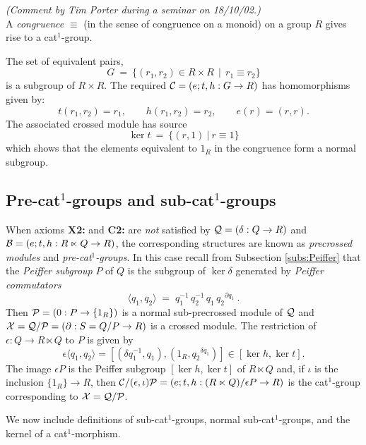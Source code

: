 \begin{prop}
\emph{(Comment by Tim Porter during a seminar on 18/10/02.)\\}
A \emph{congruence}  $\equiv$ 
(in the sense of congruence on a monoid) 
on a group $R$ gives rise to a cat$^1$-group.
\end{prop}
\begin{pf}
The set of equivalent pairs,
$$
G ~=~ \{(r_1,r_2) \in R \times R ~~|~~ r_1 \equiv r_2 \}
$$
is a subgroup of  $R \times R$.
The required  $\mathcal{C} = (e;t,h : G \to R )$  has homomorphisms given by:
$$
t(r_1,r_2) = r_1, \qquad
h(r_1,r_2) = r_2, \qquad
e(r) = (r,r).
$$
The associated crossed module has source
$$
\ker t ~=~ \{(r,1) ~|~ r \equiv 1 \}
$$
which shows that the elements equivalent to $1_R$ in the congruence
form a normal subgroup.
\end{pf}



\subsection{Pre-cat$^1$-groups and sub-cat$^1$-groups} \label{subs:precat1}

When axioms \textbf{X2:} and \textbf{C2:} are \emph{not} satisfied
by  $\mathcal{Q} = (\delta : Q \to R)$  and  
$\mathcal{B} = (e;t,h : R \ltimes Q \to R)$,
the corresponding structures are known as \emph{precrossed modules}
and \emph{pre-cat$^1$-groups}.
In this case recall from Subsection \ref{subs:Peiffer}
that the \emph{Peiffer subgroup}  $P$  of  $Q$  is the subgroup of
$\ker\delta$  generated by \emph{Peiffer commutators}
$$
\langle q_1, q_2 \rangle 
\;=\; 
q_1^{-1}\,q_2^{-1}\,q_1\,{q_2}^{\partial q_1}~.
$$
Then  $\mathcal{P} = (0 : P \to \{1_R\})$  
is a normal sub-precrossed module of  $\mathcal{Q}$  and  
$\mathcal{X} = \mathcal{Q}/\mathcal{P} = (\partial : S=Q/P \to R)$  is a crossed module.
The restriction of  $\epsilon : Q \to R \ltimes Q$  to  $P$  is given by
$$
   \epsilon \langle q_1, q_2 \rangle
 = [ (\delta q_1^{-1}, q_1), (1_R, {q_2}^{\delta q_1}) ]
 \in  [ \ker h, \ker t ].
$$
The image  $\epsilon P$  is the Peiffer subgroup
$[\ker h, \ker t]$  of  $R \ltimes Q$
and, if  $\iota$  is the inclusion  $\{ 1_R \} \to R$,  then
$\mathcal{C}/(\epsilon,\iota)\mathcal{P} = 
 (e;t,h : (R \ltimes Q) / \epsilon P \to R)$
is the cat$^1$-group corresponding to  $\mathcal{X} = \mathcal{Q}/\mathcal{P}$.


\bigskip
We now include definitions of sub-cat$^1$-groups, 
normal sub-cat$^1$-groups, and the kernel of a cat$^1$-morphism. 

